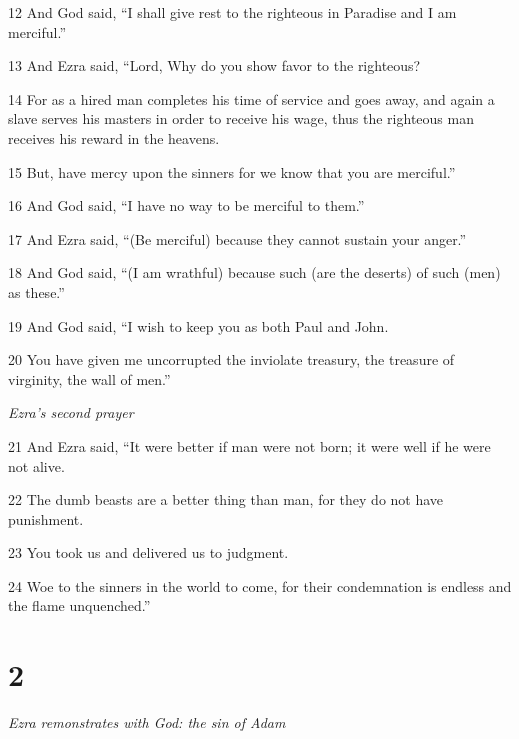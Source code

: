 \par 12 And God said, “I shall give rest to the righteous in Paradise and I am merciful.”

\par 13 And Ezra said, “Lord, Why do you show favor to the righteous?

\par 14 For as a hired man completes his time of service and goes away, and again a slave serves his masters in order to receive his wage, thus the righteous man receives his reward in the heavens. 

\par 15 But, have mercy upon the sinners for we know that you are merciful.”

\par 16 And God said, “I have no way to be merciful to them.” 

\par 17 And Ezra said, “(Be merciful) because they cannot sustain your anger.”

\par 18 And God said, “(I am wrathful) because such (are the deserts) of such (men) as these.”

\par 19 And God said, “I wish to keep you as both Paul and John.

\par 20 You have given me uncorrupted the inviolate treasury, the treasure of virginity, the wall of men.”

\par \textit{Ezra's second prayer}

\par 21 And Ezra said, “It were better if man were not born; it were well if he were not alive.

\par 22 The dumb beasts are a better thing than man, for they do not have punishment.

\par 23 You took us and delivered us to judgment. 

\par 24 Woe to the sinners in the world to come, for their condemnation is endless and the flame unquenched.”

\chapter{2}

\par \textit{Ezra remonstrates with God: the sin of Adam}


